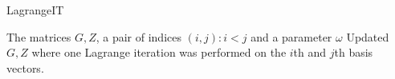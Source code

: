\begin{algorithm}[H]
\caption{LagrangeIT}
\label{customLagrangeIT}
\begin{algorithmic}
\REQUIRE The matrices $G, Z$, a pair of indices $(i,j):i<j$ and a parameter $\omega$
\ENSURE  Updated $G, Z$ where one Lagrange iteration was performed on the $i$th and $j$th basis vectors. 


\ENDIF




\ENDIF

\end{algorithmic}
\end{algorithm}
